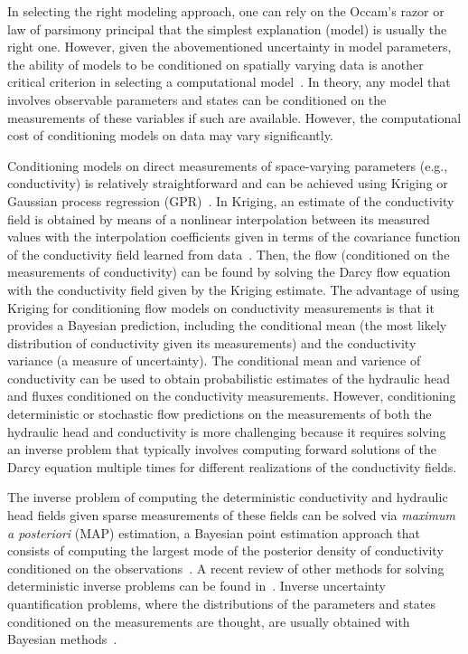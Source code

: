 \documentclass{agujournal2019}
\begin{document}
In selecting the right modeling approach, one can rely on the Occam's razor or law of parsimony principal that the simplest explanation (model) is usually the right one.
However, given the abovementioned uncertainty in model parameters, the ability of models to be conditioned on spatially varying data is another critical criterion in selecting a computational model~\citep{neuman2009perspective}.
In theory, any model that involves observable parameters and states can be conditioned on the measurements of these variables if such are available. However, the computational cost of conditioning models on data may vary significantly. 

Conditioning models on direct measurements of space-varying parameters (e.g., conductivity) is relatively straightforward and can be achieved using Kriging or Gaussian process regression (GPR)~\citep{neuman1993eulerian,Tipireddy2020JCP}.
In Kriging, an estimate of the conductivity field is obtained by means of a nonlinear interpolation between its measured values with the interpolation coefficients given in terms of the covariance function of the conductivity field learned from data~\citep{matheron1963principles,rasmussen2003gaussian}.
Then, the flow (conditioned on the measurements of conductivity) can be found by solving the Darcy flow equation with the conductivity field given by the Kriging estimate.
The advantage of using Kriging for conditioning flow models on conductivity measurements is that 
it provides a Bayesian prediction, including the conditional mean (the most likely distribution of conductivity given its measurements) and the conductivity variance (a measure of uncertainty).
The conditional mean and varience of conductivity can be used to obtain probabilistic estimates of the hydraulic head and fluxes conditioned on the conductivity measurements.
However, conditioning deterministic or stochastic flow predictions on the measurements of both the hydraulic head and conductivity is more challenging because it requires solving an inverse problem that typically involves computing forward solutions of the Darcy equation multiple times for different realizations of the conductivity fields. 

The inverse problem of computing the deterministic conductivity and hydraulic head fields given sparse measurements of these fields can be solved via \emph{maximum a posteriori} (MAP) estimation, a Bayesian point estimation approach that consists of computing the largest mode of the posterior density of conductivity 
conditioned on the observations~\citep{kitanidis1996geostatistical,barajassolano-2014-linear}.
A recent review of other methods for solving deterministic inverse problems can be found in~\cite{barajassolano-2019-pickle}.
Inverse uncertainty quantification problems, where the distributions of the parameters and states conditioned on the measurements are thought, are usually obtained with Bayesian methods~\citep{Langevin,Yoon,Barajas2019JCP,LI2020JCP}.
\end{document}
